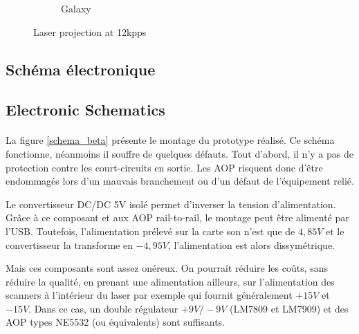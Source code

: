 \begin{figure}[ht]
\begin{bigcenter}
\begin{subfigure}[b]{0.5\textwidth}
                \caption{Galaxy}
                \label{fig:proj_test_galaxy}
        \end{subfigure}       
	\end{bigcenter}
\begin{fr}
\caption{Projection au laser à 12\unit{kpps}}
\end{fr}
\begin{en}
\caption{Laser projection at 12\unit{kpps}}
\end{en}
\label{fig:proj_test}
\end{figure}

\clearpage

\begin{appendices}
\begin{fr}
\section{Schéma électronique}
\end{fr}

\begin{en}
\section{Electronic Schematics}
\end{en}


\begin{fr}
\paragraph*{} La figure \ref{schema_beta} présente le montage du prototype réalisé. Ce schéma fonctionne, néanmoins il souffre de quelques défauts.
Tout d'abord, il n'y a pas de protection contre les court-circuits en sortie.
Les AOP risquent donc d'être endommagés lors d'un mauvais branchement ou d'un défaut de l'équipement relié.

Le convertisseur DC/DC 5\unit{V} isolé permet d'inverser la tension d'alimentation.
Grâce à ce composant et aux AOP rail-to-rail, le montage peut être alimenté par l'USB.
Toutefois, l'alimentation prélevé sur la carte son n'est que de $4,85\unit{V}$ et le convertisseur la transforme en $-4,95\unit{V}$, l'alimentation est alors dissymétrique.

Mais ces composants sont assez onéreux. On pourrait réduire les coûts, sans réduire la qualité, en prenant une alimentation ailleurs, sur l'alimentation des scanners à  l'intérieur du laser par exemple qui fournit généralement $+15\unit{V}$ et $-15\unit{V}$.
Dans ce cas, un double régulateur $+9\unit{V}/-9\unit{V}$ (LM7809 et LM7909) et des AOP types NE5532 (ou équivalents) sont suffisants.


\end{fr}
\end{appendices}
